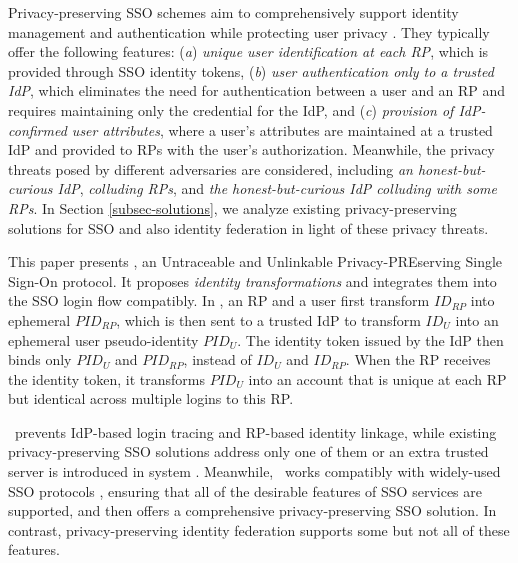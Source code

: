 Privacy-preserving SSO schemes aim to comprehensively support identity management and authentication while protecting user privacy \cite{maler2008venn, NIST2017draft, BrowserID, SPRESSO}.
They typically offer the following features:
(\emph{a}) \emph{unique user identification at each RP}, which is provided through SSO identity tokens,
(\emph{b}) \emph{user authentication only to a trusted IdP},
which eliminates the need for authentication between a user and an RP and requires maintaining only the credential for the IdP,
and (\emph{c}) \emph{provision of IdP-confirmed user attributes},
 where a user's attributes are maintained at a trusted IdP and provided to RPs with the user's authorization.
Meanwhile, the privacy threats posed by different adversaries are considered, including \emph{an honest-but-curious IdP}, \emph{colluding RPs}, and \emph{the honest-but-curious IdP colluding with some RPs}.
In Section \ref{subsec-solutions}, we analyze existing privacy-preserving solutions for SSO and also identity federation in light of these privacy threats.


This paper presents \usso, an Untraceable and Unlinkable Privacy-PREserving Single Sign-On protocol.
It proposes {\em identity transformations} and integrates them into the SSO login flow compatibly.
In \usso, an RP and a user first transform $ID_{RP}$ into ephemeral $PID_{RP}$, which is then sent to a trusted IdP to transform $ID_U$ into an ephemeral user pseudo-identity $PID_U$.
The identity token issued by the IdP then binds only $PID_U$ and $PID_{RP}$, instead of $ID_U$ and $ID_{RP}$. When the RP receives the identity token, %
 it transforms $PID_U$ into an account that is unique at each RP but identical across multiple logins to this RP.


\usso\ prevents %
 IdP-based login tracing and RP-based identity linkage, while existing privacy-preserving SSO solutions address only one of them \cite{BrowserID, SPRESSO, NIST2017draft, FirefoxAccount} or an extra trusted server is introduced in system \cite{miso}.
Meanwhile, \usso\ works compatibly with widely-used SSO protocols \cite{OpenIDConnect, rfc6749, SAML, NIST2017draft}, ensuring that all of the desirable features of SSO services are supported, and then offers a comprehensive privacy-preserving SSO solution.
In contrast, privacy-preserving identity federation \cite{PseudoID, ELPASSO, UnlimitID, Opaak, uprov, hyperledge-idemix} supports some but not all of these features.
%


